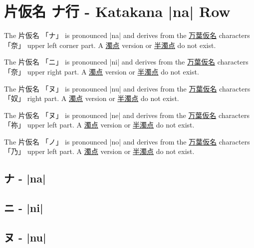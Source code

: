 \section{片仮名  ナ行 - Katakana |na| Row} \label{sec:KatakanaNaRow}


 The  片仮名 {「ナ」} is pronounced  |na| and  derives from the
\hyperref[sec:Manyogana]{万葉仮名} characters {「奈」} upper left corner part.
A \hyperref[sec:Dakuten]{濁点} version  or \hyperref[sec:Handakuten]{半濁点} do
not exist.

 The  片仮名 {「ニ」} is pronounced  |ni| and  derives from the
\hyperref[sec:Manyogana]{万葉仮名} characters {「奈」} upper right part.
A \hyperref[sec:Dakuten]{濁点} version  or \hyperref[sec:Handakuten]{半濁点} do
not exist.

 The  片仮名 {「ヌ」} is pronounced  |nu| and  derives from the
\hyperref[sec:Manyogana]{万葉仮名} characters {「奴」} right part.
A \hyperref[sec:Dakuten]{濁点} version  or \hyperref[sec:Handakuten]{半濁点} do
not exist.

\newpage

 The  片仮名 {「ヌ」} is pronounced  |ne| and  derives from the
\hyperref[sec:Manyogana]{万葉仮名} characters {「祢」} upper left  part.
A \hyperref[sec:Dakuten]{濁点} version  or \hyperref[sec:Handakuten]{半濁点} do
not exist.

 The  片仮名 {「ノ」} is pronounced  |no| and  derives from the
\hyperref[sec:Manyogana]{万葉仮名} characters {「乃」} upper left part.
A \hyperref[sec:Dakuten]{濁点} version  or \hyperref[sec:Handakuten]{半濁点} do
not exist.
\newpage

\subsection{ナ - |na|} \label{sec:KatakanaNa}

 

\subsection{ニ - |ni|} \label{sec:KatakanaNi}

 

\subsection{ヌ - |nu|} \label{sec:KatakanaNu}

